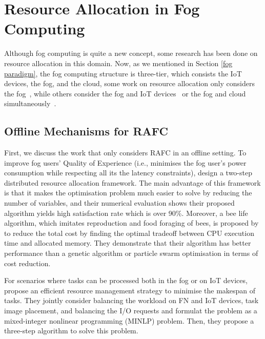 \documentclass[11pt]{phdthesis}
\begin{document}
\section{Resource Allocation in Fog Computing} \label{fog computing resource allocation}
Although fog computing is quite a new concept, some research has been done on resource allocation in this domain. Now, as we mentioned in Section \ref{fog paradigm}, the fog computing structure is three-tier, which consists the IoT devices, the fog, and the cloud, some work on resource allocation only considers the fog~\citep{oueis2015fog,aazam2015fog}, while others consider the fog and IoT devices~\citep{zeng2016joint} or the fog and cloud simultaneously~\citep{deng2015towards,agarwal2016efficient}.

\subsection{Offline Mechanisms for RAFC}

First, we discuss the work that only considers RAFC in an offline setting. To improve fog users' Quality of Experience (i.e., minimises the fog user's power consumption while respecting all its the latency constraints), \citet{oueis2015fog} design a two-step distributed resource allocation framework. The main advantage of this framework is that it makes the optimisation problem much easier to solve by reducing the number of variables, and their numerical evaluation shows their proposed algorithm yields high satisfaction rate which is over 90\%. Moreover, a bee life algorithm, which imitates reproduction and food foraging of bees, is proposed by \citet{bitam2018fog} to reduce the total cost by finding the optimal tradeoff between CPU execution time and allocated memory. They demonstrate that their algorithm has better performance than a genetic algorithm or particle swarm optimisation in terms of cost reduction. 

For scenarios where tasks can be processed both in the fog or on IoT devices, \citet{zeng2016joint} propose an efficient resource management strategy to minimise the makespan of tasks. They jointly consider balancing the workload on FN and IoT devices, task image placement, and balancing the I/O requests and formulat the problem as a mixed-integer nonlinear programming (MINLP) problem. Then, they propose a three-step algorithm to solve this problem. 
\end{document}
